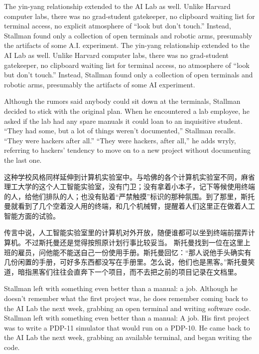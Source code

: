 \ifdefined\eng
\ifdefined\vone
The yin-yang relationship extended to the AI Lab as well. Unlike Harvard computer labs, there was no grad-student gatekeeper, no clipboard waiting list for terminal access, no explicit atmosphere of ``look but don't touch.'' Instead, Stallman found only a collection of open terminals and robotic arms, presumably the artifacts of some A.I. experiment.
\fi
\ifdefined\vtwo
The yin-yang relationship extended to the AI Lab as well. Unlike Harvard computer labs, there was no grad-student gatekeeper, no clipboard waiting list for terminal access, no atmosphere of ``look but don't touch.'' Instead, Stallman found only a collection of open terminals and robotic arms, presumably the artifacts of some AI experiment. 
\fi

\ifdefined\vone
Although the rumors said anybody could sit down at the terminals, Stallman decided to stick with the original plan.
\fi
When he encountered a lab employee, he asked if the lab had any spare manuals it could loan to an inquisitive student. ``They had some, but a lot of things weren't documented,'' Stallman recalls. \ifdefined\vone ``They were hackers after all.'' \fi\ifdefined\vtwo``They were hackers, after all,'' he adds wryly, referring to hackers' tendency to move on to a new project without documenting the last one.\fi
\fi

\ifdefined\chs
这种学校风格同样延伸到计算机实验室中。与哈佛的各个计算机实验室不同，麻省理工大学的这个人工智能实验室，没有门卫；没有拿着小本子，记下等候使用终端的人，给他们排队的人；也没有贴着``严禁触摸''标识的那种氛围。到了那里，斯托曼就看到了几个空着没人用的终端，和几个机械臂，提醒着人们这里正在做着人工智能方面的试验。

\ifdefined\vone
传言中说，人工智能实验室里的计算机对外开放，随便谁都可以坐到终端前摆弄计算机。不过斯托曼还是觉得按照原计划行事比较妥当。
\fi
斯托曼找到一位在这里上班的雇员，问他能不能送自己一份使用手册。斯托曼回忆：``那人说他手头确实有几份闲置的手册，可好多东西都没写在手册里。怎么说，他们也是黑客。''\ifdefined\vtwo 斯托曼笑道，暗指黑客们往往会直奔下一个项目，而不去把之前的项目记录在文档里。\fi
\fi

\ifdefined\eng
\ifdefined\vone
Stallman left with something even better than a manual: a job. Although he doesn't remember what the first project was, he does remember coming back to the AI Lab the next week, grabbing an open terminal and writing software code.
\fi
\ifdefined\vtwo
Stallman left with something even better than a manual: A job.  His first project was to write a PDP-11 simulator that would run on a PDP-10. He came back to the AI Lab the next week, grabbing an available terminal, and began writing the code.
\fi
\fi

